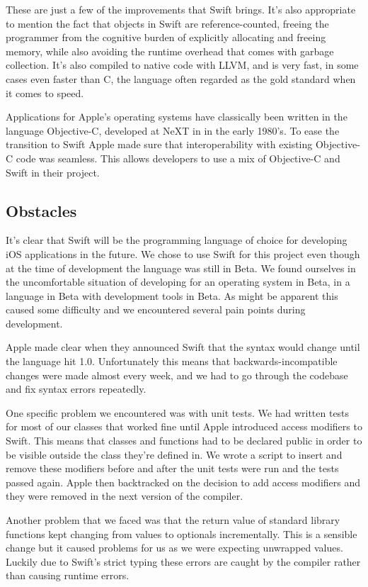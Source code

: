 \documentclass[pdftex, DIV=calc, paper=a4, fontsize=11pt]{scrartcl}	 %
\begin{document}
These are just a few of the improvements that Swift brings. It's also appropriate to mention the fact
that objects in Swift are reference-counted, freeing the programmer from the cognitive burden of
explicitly allocating and freeing memory, while also avoiding the runtime overhead that comes with
garbage collection. It's also compiled to native code with LLVM\cite{llvm}, and is very fast, in some cases even
faster than C, the language often regarded as the gold standard when it comes to speed.

Applications for Apple's operating systems have classically been written in the language Objective-C,
developed at NeXT in in the early 1980's.
To ease the transition to Swift Apple made sure that interoperability with existing Objective-C 
code was seamless. This allows developers to use a mix of Objective-C and Swift in their project.

\subsection{Obstacles}

It's clear that Swift will be the programming language of choice for developing iOS applications
in the future. We chose to use Swift for this project even though at the time of development the
language was still in Beta. We found ourselves in the uncomfortable situation of developing for an
operating system in Beta, in a language in Beta with development tools in Beta. As might be apparent
this caused some difficulty and we encountered several pain points during development.

Apple made clear when they announced Swift that the syntax would change until the language hit 1.0.
Unfortunately this means that backwards-incompatible changes were made almost every week, and we had
to go through the codebase and fix syntax errors repeatedly.

One specific problem we encountered was with unit tests. We had written tests for most of our classes
that worked fine until Apple introduced access modifiers to Swift. This means that classes and 
functions had to be declared public in order to be visible outside the class they're defined in. We
wrote a script to insert and remove these modifiers before and after the unit tests were run and
the tests passed again. Apple then backtracked on the decision to add access modifiers and they were
removed in the next version of the compiler. 

Another problem that we faced was that the return value of standard library functions kept changing
from values to optionals incrementally. This is a sensible change but it caused problems for us as
we were expecting unwrapped values. Luckily due to Swift's strict typing these errors are caught by
the compiler rather than causing runtime errors.
\end{document}
